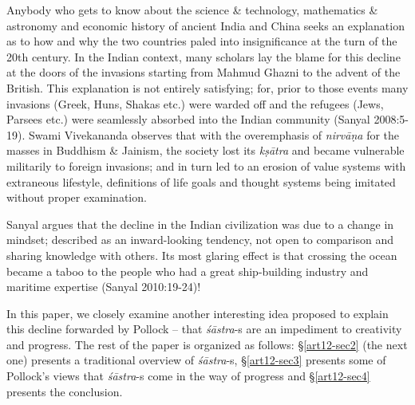 \newpage

Anybody who gets to know about the science \& technology, mathematics \& astronomy and economic history of ancient India and China seeks an explanation as to how and why the two countries paled into insigniﬁcance at the turn of the 20th century. In the Indian context, many scholars lay the blame for this decline at the doors of the invasions starting from Mahmud Ghazni to the advent of the British. This explanation is not entirely satisfying; for, prior to those events many invasions (Greek, Huns, Shakas etc.) were warded off and the refugees (Jews, Parsees etc.) were seamlessly absorbed into the Indian community (Sanyal 2008:5-19). Swami Vivekananda  observes that with the overemphasis of {\sl nirvāṇa} for the masses in Buddhism \& Jainism, the society lost its {\sl kṣātra} and became vulnerable militarily to foreign invasions; and in turn led to an erosion of value systems with extraneous lifestyle, definitions of life goals and thought systems being imitated without proper examination. 

Sanyal  argues that the decline in the Indian civilization was due to a change in mindset; described as an inward-looking tendency, not open to comparison and sharing knowledge with others. Its most glaring effect is that crossing the ocean became a taboo to the people who had a great ship-building industry and maritime expertise (Sanyal 2010:19-24)!

In this paper, we closely examine another interesting idea proposed to explain this decline forwarded by Pollock -- that {\sl śāstra}-s are an impediment to creativity and progress. The rest of the paper is organized as follows: \S\ref{art12-sec2} (the next one) presents a traditional overview of {\sl śāstra}-s,  \S\ref{art12-sec3} presents some of Pollock's views that {\sl śāstra}-s come in the way of progress and \S\ref{art12-sec4} presents the conclusion.\\[-20pt]

